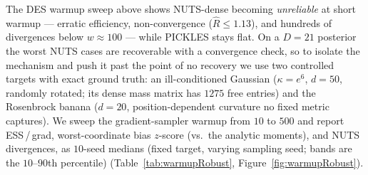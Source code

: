 \documentclass{article}
\begin{document}
The DES warmup sweep above shows NUTS-dense becoming \emph{unreliable}
at short warmup --- erratic efficiency, non-convergence
($\hat R\!\le\!1.13$), and hundreds of divergences below
$w\!\approx\!100$ --- while PICKLES stays flat. On a $D{=}21$ posterior
the worst NUTS cases are recoverable with a convergence check, so to
isolate the mechanism and push it past the point of no recovery we use
two controlled targets with exact ground truth: an
ill-conditioned Gaussian ($\kappa=e^6$, $d{=}50$, randomly rotated; its
dense mass matrix has $1275$ free entries) and the Rosenbrock banana
($d{=}20$, position-dependent curvature no fixed metric captures). We
sweep the gradient-sampler warmup from $10$ to $500$ and report
ESS\,/\,grad, worst-coordinate bias $z$-score (vs.\ the analytic
moments), and NUTS divergences, as $10$-seed medians (fixed target,
varying sampling seed; bands are the $10$--$90$th percentile)
(Table~\ref{tab:warmupRobust}, Figure~\ref{fig:warmupRobust}).
\end{document}
